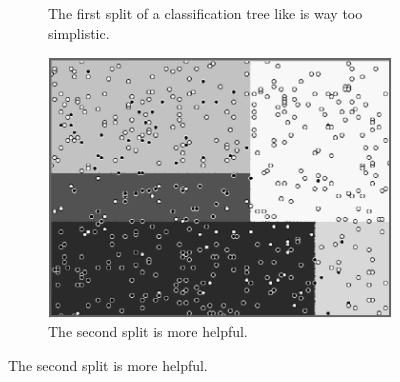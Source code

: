 \begin{figure}[!htb]
\begin{center}
\begin{subfigure}[t]{0.25\textwidth}
\caption{\label{fig:lmt2} The first split of a classification tree like is way too simplistic.}
\end{subfigure}
\hspace*{1cm}
\begin{subfigure}[t]{0.25\textwidth}
\centering
\includegraphics[width=\textwidth]{figures/chapitre6/lmt_tree_2.png}
\caption{\label{fig:lmt3}  The second split is more helpful.}
\end{subfigure}
\end{center}


\end{figure}
